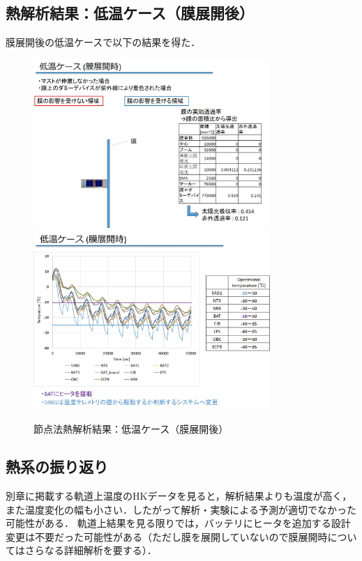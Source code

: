 \subsection{熱解析結果：低温ケース（膜展開後）}
膜展開後の低温ケースで以下の結果を得た．
\begin{figure}[H]
	\centering
	\includegraphics[width=0.8\textwidth]{03/fig/3-7-8.jpg}
	\includegraphics[width=0.8\textwidth]{03/fig/3-7-9.jpg}
	\caption{節点法熱解析結果：低温ケース（膜展開後）}
	\label{fig3-7-8}
\end{figure}

\subsection{熱系の振り返り}
別章に掲載する軌道上温度のHKデータを見ると，解析結果よりも温度が高く，また温度変化の幅も小さい．したがって解析・実験による予測が適切でなかった可能性がある．
軌道上結果を見る限りでは，バッテリにヒータを追加する設計変更は不要だった可能性がある（ただし膜を展開していないので膜展開時についてはさらなる詳細解析を要する）．